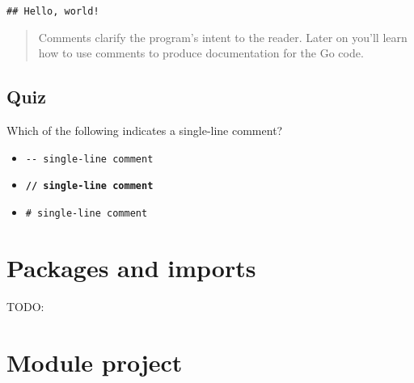 \documentclass[]{book}
\providecommand{\tightlist}{%
  \setlength{\itemsep}{0pt}\setlength{\parskip}{0pt}}
\begin{document}
\begin{verbatim}
## Hello, world!
\end{verbatim}

\begin{quote}
Comments clarify the program's intent to the reader. Later on you'll learn
how to use comments to produce documentation for the Go code.
\end{quote}

\hypertarget{quiz-4}{%
\subsection{Quiz}\label{quiz-4}}

Which of the following indicates a single-line comment?

\begin{itemize}
\tightlist
\item
  \texttt{-\/-\ single-line\ comment}
\item
  \textbf{\texttt{//\ single-line\ comment}}
\item
  \texttt{\#\ single-line\ comment}
\end{itemize}

\hypertarget{packages-and-imports}{%
\section{Packages and imports}\label{packages-and-imports}}

TODO:

\hypertarget{module-project}{%
\section*{Module project}\label{module-project}}
\end{document}
